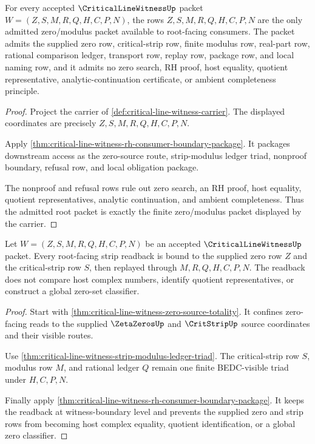 \begin{theorem}
\label{thm:critical-line-witness-root-zero-modulus-carrier}
For every accepted $\CriticalLineWitnessUp$ packet $W=(Z,S,M,R,Q,H,C,P,N)$, the rows $Z,S,M,R,Q,H,C,P,N$ are the only admitted zero/modulus packet available to root-facing consumers. The packet admits the supplied zero row, critical-strip row, finite modulus row, real-part row, rational comparison ledger, transport row, replay row, package row, and local naming row, and it admits no zero search, RH proof, host equality, quotient representative, analytic-continuation certificate, or ambient completeness principle.
\end{theorem}
\begin{proof}
Project the carrier of \autoref{def:critical-line-witness-carrier}. The displayed coordinates are precisely $Z,S,M,R,Q,H,C,P,N$.

Apply \autoref{thm:critical-line-witness-rh-consumer-boundary-package}. It packages downstream access as the zero-source route, strip-modulus ledger triad, nonproof boundary, refusal row, and local obligation package.

The nonproof and refusal rows rule out zero search, an RH proof, host equality, quotient representatives, analytic continuation, and ambient completeness. Thus the admitted root packet is exactly the finite zero/modulus packet displayed by the carrier.
\end{proof}

\begin{theorem}
\label{thm:critical-line-witness-root-strip-readback}
Let $W=(Z,S,M,R,Q,H,C,P,N)$ be an accepted $\CriticalLineWitnessUp$ packet. Every root-facing strip readback is bound to the supplied zero row $Z$ and the critical-strip row $S$, then replayed through $M,R,Q,H,C,P,N$. The readback does not compare host complex numbers, identify quotient representatives, or construct a global zero-set classifier.
\end{theorem}
\begin{proof}
Start with \autoref{thm:critical-line-witness-zero-source-totality}. It confines zero-facing reads to the supplied $\ZetaZerosUp$ and $\CritStripUp$ source coordinates and their visible routes.

Use \autoref{thm:critical-line-witness-strip-modulus-ledger-triad}. The critical-strip row $S$, modulus row $M$, and rational ledger $Q$ remain one finite BEDC-visible triad under $H,C,P,N$.

Finally apply \autoref{thm:critical-line-witness-rh-consumer-boundary-package}. It keeps the readback at witness-boundary level and prevents the supplied zero and strip rows from becoming host complex equality, quotient identification, or a global zero classifier.
\end{proof}

